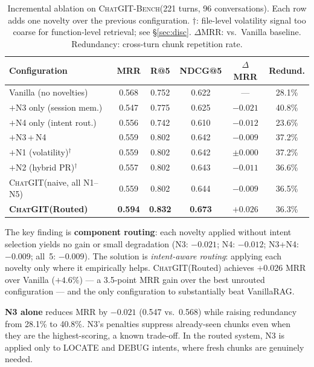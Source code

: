 \documentclass[runningheads]{llncs}
\newcommand{\chatgit}{\textsc{ChatGIT}\xspace}
\newcommand{\conv}{\textsc{ChatGIT-Bench}\xspace}
\begin{document}
\begin{table}[t]
\centering
\caption{Incremental ablation on \conv (221 turns, 96 conversations).
Each row adds one novelty over the previous configuration.
$\dagger$: file-level volatility signal too coarse for
function-level retrieval; see \S\ref{sec:disc}.
$\Delta$MRR: vs.\ Vanilla baseline.
Redundancy: cross-turn chunk repetition rate.}
\label{tab:ablation}
\footnotesize
\begin{tabular}{lccccc}
\toprule
Configuration & MRR & R@5 & NDCG@5 & $\Delta$MRR & Redund. \\
\midrule
Vanilla (no novelties)  & 0.568 & 0.752 & 0.622 & --- & 28.1\% \\
\quad $+$N3 only (session mem.) & 0.547 & 0.775 & 0.625 & $-0.021$ & 40.8\% \\
\quad $+$N4 only (intent rout.) & 0.556 & 0.742 & 0.610 & $-0.012$ & 23.6\% \\
$+$N3\,+\,N4                   & 0.559 & 0.802 & 0.642 & $-0.009$ & 37.2\% \\
\quad $+$N1 (volatility)$^{\dagger}$ & 0.559 & 0.802 & 0.642 & $\pm$0.000 & 37.2\% \\
\quad $+$N2 (hybrid PR)$^{\dagger}$ & 0.557 & 0.802 & 0.643 & $-0.011$ & 36.6\% \\
\chatgit (naive, all N1--N5)   & 0.559 & 0.802 & 0.644 & $-0.009$ & 36.5\% \\
\rowcolor{cIndigo!8}
\textbf{\chatgit (Routed)}     & \textbf{0.594} & \textbf{0.832}
  & \textbf{0.673} & $\mathbf{+0.026}$ & 36.3\% \\
\bottomrule
\end{tabular}
\end{table}

The key finding is \textbf{component routing}: each novelty applied
without intent selection yields no gain or small degradation (N3: $-0.021$;
N4: $-0.012$; N3+N4: $-0.009$; all~5: $-0.009$). The solution
is \emph{intent-aware routing}: applying each novelty only where
it empirically helps. \chatgit (Routed) achieves $+0.026$ MRR
over Vanilla ($+4.6\%$) --- a 3.5-point MRR gain over the best
unrouted configuration --- and the only configuration to substantially beat VanillaRAG.

\textbf{N3 alone} reduces MRR by $-0.021$ (0.547 vs.\ 0.568)
while raising redundancy from 28.1\% to 40.8\%. N3's penalties
suppress already-seen chunks even when they are the highest-scoring,
a known trade-off. In the routed system, N3 is applied only to
LOCATE and DEBUG intents, where fresh chunks are genuinely needed.
\end{document}
